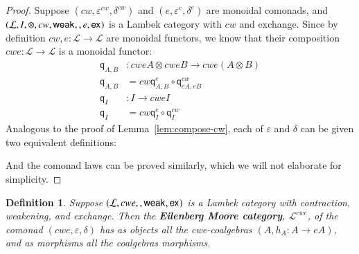 \documentclass{article}
\newtheorem{definition}[theorem]{Definition}
\let\mto\to
\let\to\relax
\newcommand{\to}{\rightarrow}
\let\c\relax
\newcommand{\cat}[1]{\mathcal{#1}}
\newcommand{\w}[1]{\mathsf{weak}_{#1}}
\newcommand{\c}[1]{\mathsf{contra}_{#1}}
\newcommand{\e}[1]{\mathsf{ex}_{#1}}
\newcommand{\q}[1]{\mathsf{q}_{#1}}
\begin{document}
\begin{proof}
  Suppose $(cw,\varepsilon^{cw},\delta^{cw})$ and
  $(e,\varepsilon^e,\delta^e)$ are monoidal comonads, and \\
  $(\cat{L},I,\otimes,cw,\w{},\c{},e,\e{})$ is a
  Lambek category with $cw$ and exchange. Since by definition
  $cw,e:\cat{L}\mto\cat{L}$ are monoidal functors, we know that their
  composition \\
  $cwe:\cat{L}\mto\cat{L}$ is a monoidal functor:
  \begin{align*}
    \q{A,B} &: cweA\otimes cweB\mto cwe(A\otimes B)   \\
    \q{A,B} &= cw\q{A,B}^e\circ\q{eA,eB}^{cw}         \\
    \q{I}   &: I\mto cweI                             \\
    \q{I}   &= cw\q{I}^e\circ\q{I}^{cw}
  \end{align*}
  Analogous to the proof of Lemma~\ref{lem:compose-cw}, each of
  $\varepsilon$ and $\delta$ can be given two equivalent definitions:
  And the comonad laws can be proved similarly, which we will not elaborate
  for simplicity.
\end{proof}

\begin{definition}
  Suppose $(\cat{L}, cwe, \c{}, \w{}, \e{})$ is a Lambek category with
  contraction, weakening, and exchange. Then the \textbf{Eilenberg Moore
  category}, $\cat{L}^{cwe}$, of the comonad $(cwe,\varepsilon,\delta)$
  has as objects all the cwe-coalgebras $(A,h_A:A\mto eA)$, and as
  morphisms all the coalgebras morphisms. 
\end{definition}
\end{document}
